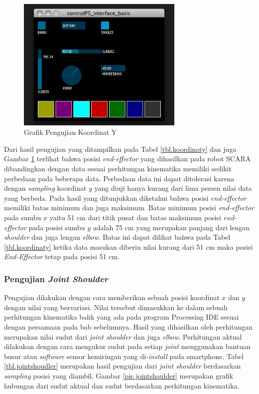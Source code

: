  \begin{figure}[H]
 	\centering
 	\includegraphics[width=8cm]{gambar/controlp5.jpg}
 	\caption{Grafik Pengujian Koordinat Y}
 	\label{pic.koordinaty}
 \end{figure}


Dari hasil pengujian yang ditampilkan pada Tabel \ref{tbl.koordinaty} dan juga Gambar \ref{pic.koordinaty} terlihat bahwa posisi \textit{end-effector} yang dihasilkan pada robot SCARA dibandingkan dengan data sesuai perhitungan kinematika memiliki sedikit perbedaan pada beberapa data. Perbedaan data ini dapat ditolerasi karena dengan \textit{sampling} koordinat $y$ yang diuji hanya kurang dari lima persen nilai data yang berbeda. Pada hasil yang ditunjukkan diketahui bahwa posisi \textit{end-effector} memiliki batas minimum dan juga maksimum. Batas minimum posisi \textit{end-effector} pada sumbu $x$ yaitu 51 cm dari titik pusat dan batas maksimum posisi \textit{end-effector} pada posisi sumbu $y$ adalah 75 cm yang merupakan panjang dari lengan \textit{shoulder} dan juga lengan \textit{elbow}.  Batas ini dapat dilihat bahwa pada Tabel \ref{tbl.koordinaty} ketika data masukan diberin nilai kurang dari 51 cm maka posisi \textit{End-Effector} tetap pada posisi 51 cm.

\subsubsection{Pengujian \textit{Joint Shoulder}}
Pengujian dilakukan dengan cara memberikan sebuah posisi koordinat $x$ dan $y$ dengan nilai yang bervariasi. Nilai tersebut dimasukkan ke dalam sebuah perhitungan kinematika balik yang ada pada program Processing IDE sesuai dengan persamaan pada bab sebelumnya. Hasil yang dihasilkan oleh perhitungan merupakan nilai sudut dari \textit{joint shoulder} dan juga \textit{elbow}. Perhitungan aktual dilakukan dengan cara mengukur sudut pada setiap \textit{joint} menggunakan bantuan busur atau \textit{software} sensor kemiringan yang di-\textit{install} pada smartphone. Tabel \ref{tbl.jointshoudler} merupakan hasil pengujian dari \textit{joint shoulder} berdasarkan \textit{sampling} posisi yang diambil. Gambar \ref{pic.jointshoulder} merupakan grafik hubungan dari sudut aktual dan sudut berdasarkan perhitungan kinematika. 

